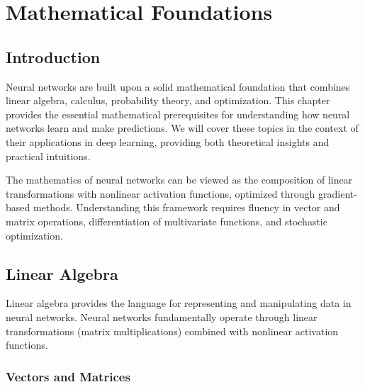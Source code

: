 %
%
%

\clearpage
\cleardoublepage

\chapter{Mathematical Foundations}

\section{Introduction}

Neural networks are built upon a solid mathematical foundation that combines linear algebra, calculus, probability theory, and optimization. This chapter provides the essential mathematical prerequisites for understanding how neural networks learn and make predictions. We will cover these topics in the context of their applications in deep learning, providing both theoretical insights and practical intuitions.

The mathematics of neural networks can be viewed as the composition of linear transformations with nonlinear activation functions, optimized through gradient-based methods. Understanding this framework requires fluency in vector and matrix operations, differentiation of multivariate functions, and stochastic optimization.

\section{Linear Algebra}

Linear algebra provides the language for representing and manipulating data in neural networks. Neural networks fundamentally operate through linear transformations (matrix multiplications) combined with nonlinear activation functions.

\subsection{Vectors and Matrices}

